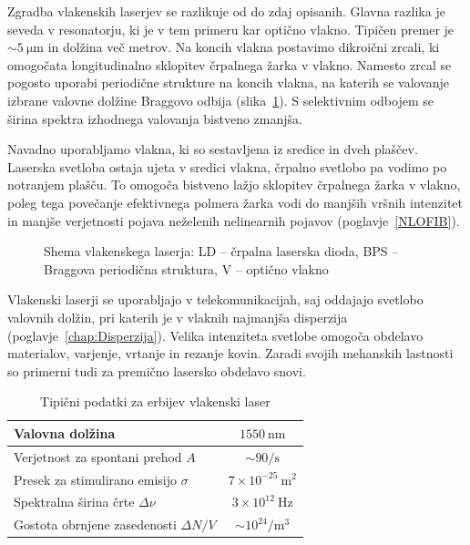 Zgradba vlakenskih laserjev se razlikuje od do zdaj opisanih. Glavna razlika je
seveda v resonatorju, ki je v tem primeru kar optično vlakno. Tipičen premer je 
$\sim 5~\si{\micro\meter}$ in dolžina več metrov. Na koncih vlakna 
postavimo dikroični zrcali, ki omogočata longitudinalno sklopitev črpalnega 
žarka v vlakno. Namesto zrcal se pogosto uporabi periodične strukture 
na koncih vlakna, na katerih se valovanje izbrane valovne dolžine Braggovo odbija
(slika~\ref{fig:Fibshema}). 
S selektivnim odbojem se širina spektra izhodnega valovanja bistveno zmanjša. 

Navadno uporabljamo vlakna, ki so sestavljena iz sredice in dveh plaščev. Laserska
svetloba ostaja ujeta v sredici vlakna, črpalno svetlobo pa vodimo po notranjem plašču. To
omogoča bistveno lažjo sklopitev črpalnega žarka v vlakno, poleg tega povečanje
efektivnega polmera žarka vodi do manjših vršnih intenzitet in manjše verjetnosti
pojava neželenih nelinearnih pojavov (poglavje~\ref{NLOFIB}).

\begin{figure}[h]
\centering
\def\svgwidth{100truemm} 

\caption{Shema vlakenskega laserja: LD -- črpalna laserska dioda, 
BPS -- Braggova periodična struktura, V -- optično vlakno
}
\label{fig:Fibshema}
\end{figure}

Vlakenski laserji se uporabljajo v telekomunikacijah, saj oddajajo svetlobo 
valovnih dolžin, pri katerih je v vlaknih najmanjša disperzija (poglavje~\ref{chap:Disperzija}). 
Velika intenziteta svetlobe omogoča obdelavo materialov, varjenje, vrtanje in rezanje kovin. 
Zaradi svojih mehanskih lastnosti so primerni tudi za premično lasersko obdelavo snovi.

\begin{table}[!h]
\begin{center}
\begin{tabular}{|l|c|}\hline
Valovna dolžina  & $1550~\si{\nano\meter}$\\ \hline
Verjetnost za spontani prehod $A$ & $ \sim 90/\si{\second}$ \\ \hline
Presek za stimulirano emisijo $\sigma$ & $7 \times 10^{-25}~\si{\metre}^2$ \\ \hline
Spektralna širina črte $\Delta \nu$ & $3 \times 10^{12}~\si{\hertz}$  \\ \hline
Gostota obrnjene zasedenosti $\Delta N/V$ & $ \sim 10^{24}/\si{\metre}^3$ \\ \hline
\end{tabular}
\caption{Tipični podatki za erbijev vlakenski laser}
\label{tab:fib}
\end{center}
\end{table}

